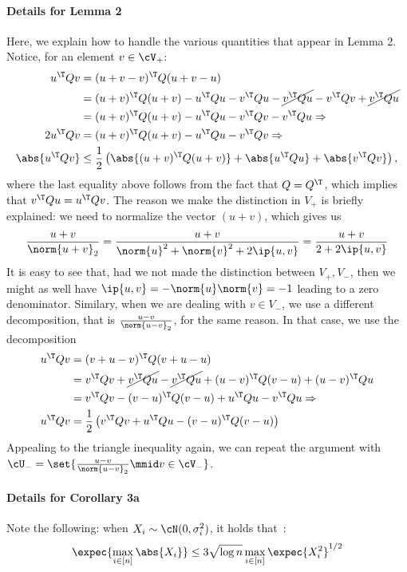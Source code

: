\documentclass[a4paper]{article}
\begin{document}
\paragraph{Details for Lemma 2}
Here, we explain how to handle the various quantities that appear in Lemma 2.
Notice, for an element $v \in \cV_+$:
\begin{align*}
	u^\T Q v &= (u + v - v)^\T Q (u + v - u) \\
		&= (u + v)^\T Q (u + v) - u^\T Q u - v^\T Q u
		 - \cancel{v^\T Q u} - v^\T Q v + \cancel{v^\T Q u} \\
		&= (u + v)^\T Q (u + v) - u^\T Q u - v^\T Q v - v^\T Q u \Rightarrow \\
	2 u^\T Q v &= (u + v)^\T Q (u + v) - u^\T Q u - v^\T Q v \Rightarrow \\
	\abs{u^\T Q v} &\leq \frac{1}{2} \left(
		\abs{(u + v)^\T Q (u + v)} + \abs{u^\T Q u} + \abs{v^\T Q v}
	\right),
\end{align*}
where the last equality above follows from the fact that $Q = Q^\T$, which
implies that $v^\T Q u = u^\T Q v$. The reason we make the distinction in $V_+$
is briefly explained: we need to normalize the vector $(u + v)$, which gives us
\[
	\frac{u + v}{\norm{u + v}_2} =
	\frac{u + v}{\norm{u}^2 + \norm{v}^2 + 2 \ip{u, v}} =
	\frac{u + v}{2 + 2 \ip{u, v}}
\]
It is easy to see that, had we not made the distinction between $V_+, V_-$,
then we might as well have $\ip{u, v} = -\norm{u} \norm{v} = -1$ leading to a
zero denominator. Similary, when we are dealing with $v \in V_-$, we use a
different decomposition, that is $\frac{u - v}{\norm{u - v}_2}$, for the same
reason. In that case, we use the decomposition
\begin{align*}
    u^\T Q v &= (v + u - v)^\T Q (v + u - u) \\
        &= v^\T Q v + \cancel{v^\T Q u} - \cancel{v^\T Q u} + (u - v)^\T Q (v -
        u) + (u - v)^\T Q u \\
        &= v^\T Q v - (v - u)^\T Q (v - u) + u^\T Q u - v^\T Q u \Rightarrow \\
    u^\T Q v &= \frac{1}{2} \left(
        v^\T Q v + u^\T Q u - (v - u)^\T Q (v - u)
    \right)
\end{align*}
Appealing to the triangle inequality again, we can repeat the argument with
$\cU_- = \set{\frac{u - v}{\norm{u - v}_2} \mmid v \in \cV_-}$.

\paragraph{Details for Corollary 3a}
Note the following: when $X_i \sim \cN(0, \sigma_i^2)$, it holds
that~\cite[Eq. (3.13)]{LedTal13}:
\begin{equation}
    \expec{\max_{i \in [n]} \abs{X_i}} \leq 3 \sqrt{\log n} \max_{i \in [n]}
    \expec{X_i^2}^{1/2}
    \label{eq:expected_sup_gaussian}
\end{equation}
\end{document}
